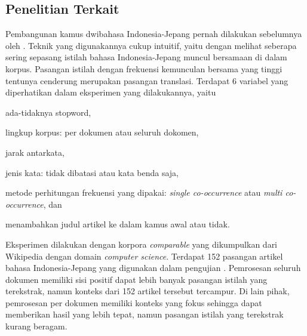 \documentclass[../main/main.tex]{subfiles}
\begin{document}
\subsection{Penelitian Terkait}
\label{studi_terkait}
Pembangunan kamus dwibahasa Indonesia-Jepang pernah dilakukan sebelumnya oleh \textcite{limanthie}. Teknik yang digunakannya cukup intuitif, yaitu dengan melihat seberapa sering sepasang istilah bahasa Indonesia-Jepang muncul bersamaan di dalam korpus. Pasangan istilah dengan frekuensi kemunculan bersama yang tinggi tentunya cenderung merupakan pasangan translasi. Terdapat 6 variabel yang diperhatikan dalam eksperimen yang dilakukannya, yaitu
\begin{inparaenum}[(1)]
\item ada-tidaknya \gls{stopword},
\item lingkup korpus: per dokumen atau seluruh dokomen,
\item jarak antarkata,
\item jenis kata: tidak dibatasi atau kata benda saja,
\item metode perhitungan frekuensi yang dipakai: \textit{single co-occurrence} atau \textit{multi co-occurrence}, dan
\item menambahkan judul artikel ke dalam kamus awal atau tidak.
\end{inparaenum}

Eksperimen dilakukan dengan korpora \textit{comparable} yang dikumpulkan dari Wikipedia dengan domain \textit{computer science}. Terdapat 152 pasangan artikel bahasa Indonesia-Jepang yang digunakan dalam pengujian \parencite{limanthie}. Pemrosesan seluruh dokumen memiliki sisi positif dapat lebih banyak pasangan istilah yang terekstrak, namun konteks dari 152 artikel tersebut tercampur. Di lain pihak, pemrosesan per dokumen memiliki konteks yang fokus sehingga dapat memberikan hasil yang lebih tepat, namun pasangan istilah yang terekstrak kurang beragam.
\end{document}
